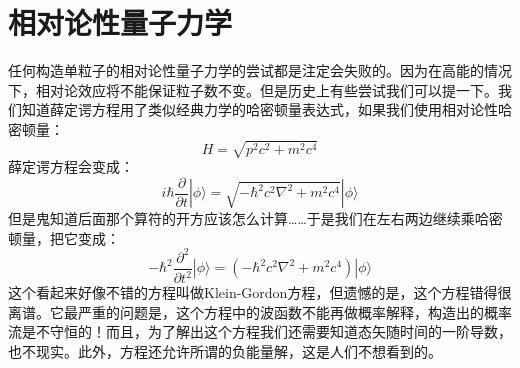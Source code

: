 \documentclass{ctexart}
\begin{document}
\section{相对论性量子力学}
任何构造单粒子的相对论性量子力学的尝试都是注定会失败的。因为在高能的情况下，相对论效应将不能保证粒子数不变。但是历史上有些尝试我们可以提一下。我们知道薛定谔方程用了类似经典力学的哈密顿量表达式，如果我们使用相对论性哈密顿量：
\begin{equation}
H=\sqrt{p^2c^2+m^2c^4}
\end{equation}
薛定谔方程会变成：
\begin{equation}
i\hbar\frac{\partial}{\partial t}|\phi\rangle=\sqrt{-\hbar^2c^2\nabla^2+m^2c^4}|\phi\rangle 
\end{equation}
但是鬼知道后面那个算符的开方应该怎么计算……于是我们在左右两边继续乘哈密顿量，把它变成：
\begin{equation}
-\hbar^2\frac{\partial^2}{\partial t^2}|\phi\rangle=(-\hbar^2c^2\nabla^2+m^2c^4)|\phi\rangle
\end{equation}
这个看起来好像不错的方程叫做Klein-Gordon方程，但遗憾的是，这个方程错得很离谱。它最严重的问题是，这个方程中的波函数不能再做概率解释，构造出的概率流是不守恒的！而且，为了解出这个方程我们还需要知道态矢随时间的一阶导数，也不现实。此外，方程还允许所谓的负能量解，这是人们不想看到的。
\end{document}
